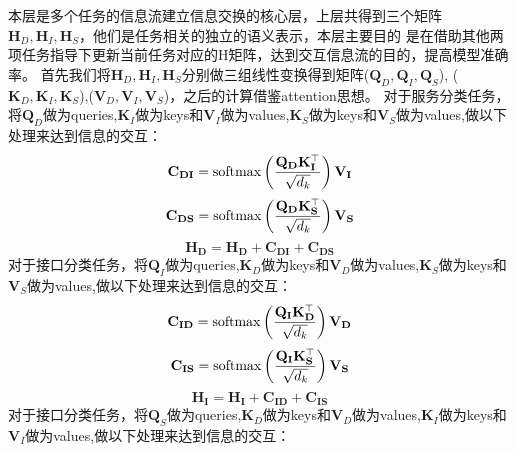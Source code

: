 本层是多个任务的信息流建立信息交换的核心层，上层共得到三个矩阵$\mathbf{H}_{D},\mathbf{H}_{I},\mathbf{H}_{S}$，他们是任务相关的独立的语义表示，本层主要目的
是在借助其他两项任务指导下更新当前任务对应的H矩阵，达到交互信息流的目的，提高模型准确率。
首先我们将$\mathbf{H}_{D},\mathbf{H}_{I},\mathbf{H}_{S}$分别做三组线性变换得到矩阵($\mathbf{Q}_{D},\mathbf{Q}_{I},\mathbf{Q}_{S}$),
($\mathbf{K}_{D},\mathbf{K}_{I},\mathbf{K}_{S}$),($\mathbf{V}_{D},\mathbf{V}_{I},\mathbf{V}_{S}$)，之后的计算借鉴attention思想。
对于服务分类任务，将$\mathbf{Q}_{D}$做为queries,$\mathbf{K}_{I}$做为keys和$\mathbf{V}_{I}$做为values,$\mathbf{K}_{S}$做为keys和$\mathbf{V}_{S}$做为values,做以下处理来达到信息的交互：
\begin{equation}
  \mathbf{C}_{\mathbf{DI}}=\operatorname{softmax}\left(\frac{\mathbf{Q}_{\mathbf{D}} \mathbf{K}_{\mathbf{I}}^{\top}}{\sqrt{d_{k}}}\right) \mathbf{V}_{\mathbf{I}}\\
\end{equation}
\begin{equation}  
\mathbf{C}_{\mathbf{DS}}=\operatorname{softmax}\left(\frac{\mathbf{Q}_{\mathbf{D}} \mathbf{K}_{\mathbf{S}}^{\top}}{\sqrt{d_{k}}}\right) \mathbf{V}_{\mathbf{S}}\\
\end{equation}
\begin{equation}  
\mathbf{H}_\mathbf{D}=\mathbf{H}_\mathbf{D}+\mathbf{C}_{\mathbf{DI}}+\mathbf{C}_{\mathbf{DS}}
\end{equation}
对于接口分类任务，将$\mathbf{Q}_{I}$做为queries,$\mathbf{K}_{D}$做为keys和$\mathbf{V}_{D}$做为values,$\mathbf{K}_{S}$做为keys和$\mathbf{V}_{S}$做为values,做以下处理来达到信息的交互：
\begin{equation}
  \mathbf{C}_{\mathbf{ID}}=\operatorname{softmax}\left(\frac{\mathbf{Q}_{\mathbf{I}} \mathbf{K}_{\mathbf{D}}^{\top}}{\sqrt{d_{k}}}\right) \mathbf{V}_{\mathbf{D}}\\
\end{equation}
\begin{equation}
  \mathbf{C}_{\mathbf{IS}}=\operatorname{softmax}\left(\frac{\mathbf{Q}_{\mathbf{I}} \mathbf{K}_{\mathbf{S}}^{\top}}{\sqrt{d_{k}}}\right) \mathbf{V}_{\mathbf{S}}\\
\end{equation}
\begin{equation}
  \mathbf{H}_\mathbf{I}=\mathbf{H}_\mathbf{I}+\mathbf{C}_{\mathbf{ID}}+\mathbf{C}_{\mathbf{IS}}
\end{equation}
对于接口分类任务，将$\mathbf{Q}_{S}$做为queries,$\mathbf{K}_{D}$做为keys和$\mathbf{V}_{D}$做为values,$\mathbf{K}_{I}$做为keys和$\mathbf{V}_{I}$做为values,做以下处理来达到信息的交互：
